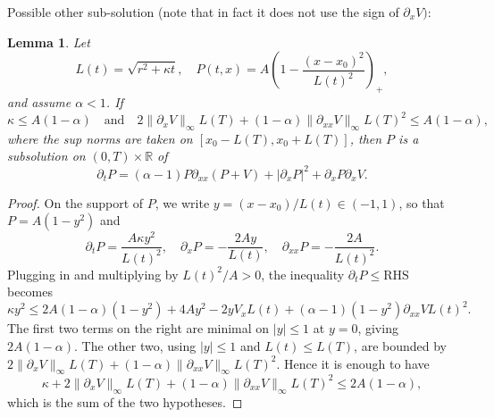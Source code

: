 \documentclass[a4paper,twosided, 11pt]{article}
\theoremstyle{plain}
\newtheorem{lemma}[thm]{Lemma}
\theoremstyle{remark}
\numberwithin{equation}{section}
\begin{document}
{\color{teal} Possible other sub-solution (note that in fact it does not use the sign of $\partial_xV)$:
\begin{lemma}
Let
$$
L(t) = \sqrt{r^{2}+\kappa t},
\quad P(t,x) = A\left(1-\frac{(x-x_{0})^{2}}{L(t)^{2}}\right)_{+},
$$
and assume $\alpha<1$. If
$$
\kappa \le A(1-\alpha)
\quad\text{and}\quad
2\| \partial_{x}V\|_\infty L(T) + (1-\alpha)\| \partial_{xx}V\|_\infty L(T)^{2} \le A(1-\alpha),
$$
where the sup norms are taken on $[x_0-L(T),x_0+L(T)]$, then $P$ is a subsolution on $(0,T)\times\mathbb{R}$ of
$$
\partial_{t}P = (\alpha-1)P\partial_{xx}(P+V) + |\partial_{x}P|^{2} + \partial_{x}P\partial_{x}V.
$$
\end{lemma}


\begin{proof}
On the support of $P$, we write $y = (x-x_0)/L(t) \in (-1,1)$, so that $P = A(1-y^2)$ and
$$
\partial_{t}P = \frac{A\kappa y^{2}}{L(t)^{2}},
\quad
\partial_{x}P = -\frac{2Ay}{L(t)},
\quad
\partial_{xx}P = -\frac{2A}{L(t)^{2}}.
$$
Plugging in and multiplying by $L(t)^2/A > 0$, the  inequality $\partial_t P \le \text{RHS}$ becomes
$$
\kappa y^{2} \le 2A(1-\alpha)(1-y^{2}) + 4Ay^{2} - 2y V_{x} L(t) + (\alpha-1)(1-y^{2})  \partial_{xx}V L(t)^{2}.
$$
The first two terms on the right are minimal on $|y|\le 1$ at $y = 0$, giving $2A(1-\alpha)$. The other two, using $|y|\le 1$ and $L(t) \le L(T)$, are bounded by $2\| \partial_{x}V\|_\infty L(T) + (1-\alpha)\| \partial_{xx}V\|_\infty L(T)^2$. Hence it is enough to have
$$
\kappa + 2\| \partial_{x}V\|_\infty L(T) + (1-\alpha)\| \partial_{xx}V\|_\infty L(T)^{2} \le 2A(1-\alpha),
$$
which is the sum of the two hypotheses.
\end{proof}
}


\fi
\end{document}
